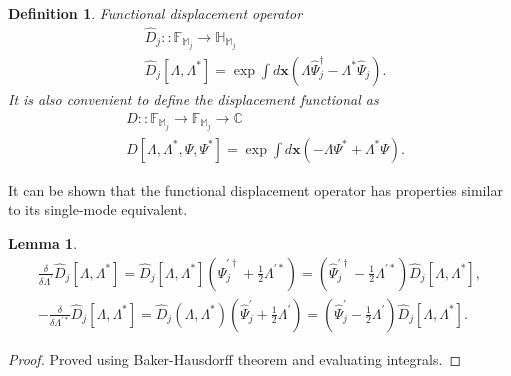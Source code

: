 \documentclass[12pt,aip,jmp,amssymb,amsmath]{revtex4-1}
\newtheorem{definition}{Definition}
\newtheorem{lemma}{Lemma}
\begin{document}
\begin{definition}
    Functional displacement operator
    \begin{equation*}\begin{split}
        & \hat{D}_j :: \mathbb{F}_{\mathbb{M}_j} \rightarrow \mathbb{H}_{\mathbb{M}_j} \\
        & \hat{D}_j[\Lambda, \Lambda^*] = \exp \int d\boldsymbol{x} \left(
            \Lambda \hat{\Psi}_j^\dagger - \Lambda^* \hat{\Psi}_j
        \right).
    \end{split}\end{equation*}
    It is also convenient to define the displacement functional as
    \begin{equation*}\begin{split}
        & D :: \mathbb{F}_{\mathbb{M}_j} \rightarrow \mathbb{F}_{\mathbb{M}_j} \rightarrow \mathbb{C} \\
        & D[\Lambda, \Lambda^*, \Psi, \Psi^*] = \exp \int d\boldsymbol{x} \left(
            -\Lambda \Psi^* + \Lambda^* \Psi
        \right).
    \end{split}\end{equation*}
\end{definition}

It can be shown that the functional displacement operator has properties similar to its single-mode equivalent.

\begin{lemma}
\label{lmm:func-wigner:displacement-derivatives}
    \begin{equation*}\begin{split}
        \frac{\delta}{\delta \Lambda^\prime} \hat{D}_j[\Lambda, \Lambda^*]
        = \hat{D}_j[\Lambda, \Lambda^*] (\hat{\Psi}_j^{\prime\dagger} + \frac{1}{2} \Lambda^{\prime*})
        = (\hat{\Psi}_j^{\prime\dagger} - \frac{1}{2} \Lambda^{\prime*}) \hat{D}_j[\Lambda, \Lambda^*], \\
        -\frac{\delta}{\delta \Lambda^{\prime*}} \hat{D}_j[\Lambda, \Lambda^*]
        = \hat{D}_j(\Lambda, \Lambda^*) (\hat{\Psi}_j^\prime + \frac{1}{2} \Lambda^\prime)
        = (\hat{\Psi}_j^\prime - \frac{1}{2} \Lambda^\prime) \hat{D}_j[\Lambda, \Lambda^*].
    \end{split}\end{equation*}
\end{lemma}
\begin{proof}
Proved using Baker-Hausdorff theorem and evaluating integrals.
\end{proof}
\end{document}
